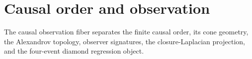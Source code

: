 \section{Causal order and observation}

The causal observation fiber separates the finite causal order, its cone
geometry, the Alexandrov topology, observer signatures, the closure-Laplacian
projection, and the four-event diamond regression object.








